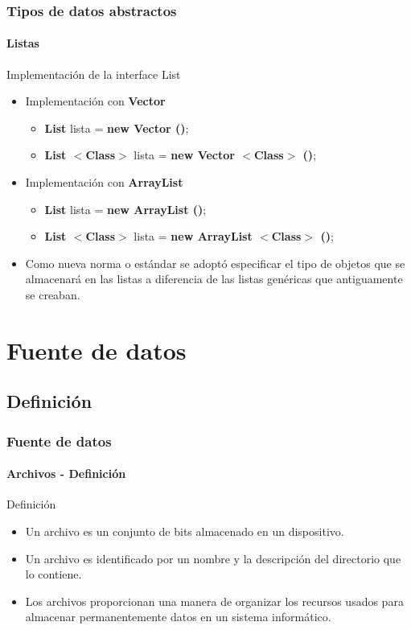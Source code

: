 \documentclass{beamer}
\begin{document}
		\begin{frame}
			\frametitle{Tipos de datos abstractos}
			\framesubtitle{Listas}

			\begin{block}{Implementaci\'on de la interface List}
				\begin{itemize}
					\item Implementaci\'on con \textbf{Vector}
					\begin{itemize}
						\item \textbf{List} lista = \textbf{new Vector ()};
						\item \textbf{List $<$Class$>$} lista = \textbf{new Vector $<$Class$>$ ()};
					\end{itemize}
					\item Implementaci\'on con \textbf{ArrayList}
					\begin{itemize}
						\item \textbf{List} lista = \textbf{new ArrayList ()};
						\item \textbf{List $<$Class$>$} lista = \textbf{new ArrayList $<$Class$>$ ()};
					\end{itemize}
					\item Como nueva norma o est\'andar se adopt\'o especificar el tipo de objetos que se almacenar\'a en las listas a diferencia de las listas gen\'ericas que antiguamente se creaban.
				\end{itemize}
			\end{block}
		\end{frame}

    \section{Fuente de datos}

		\subsection{Definici\'on}

		\begin{frame}
			\frametitle{Fuente de datos}
			\framesubtitle{Archivos - Definici\'on}

			\begin{block}{Definici\'on}
				\begin{itemize}
					\item Un archivo es un conjunto de bits almacenado en un dispositivo.
					\item Un archivo es identificado por un nombre y la descripci\'on del directorio que lo contiene.
					\item Los archivos proporcionan una manera de organizar los recursos usados para almacenar permanentemente datos en un sistema inform\'atico.
				\end{itemize}
			\end{block}
		\end{frame}
\end{document}
